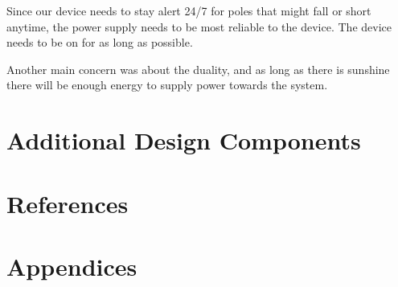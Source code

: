 \documentclass[12pt]{article}
\begin{document}

Since our device needs to stay alert 24/7 for poles that might fall or short anytime, the power supply needs to be most reliable to the device. The device needs to be on for as long as possible. 

Another main concern was about the duality, and as long as there is sunshine there will be enough energy to supply power towards the system.  

\section{Additional Design Components}

\section{References}

\section{Appendices}
\end{document}
